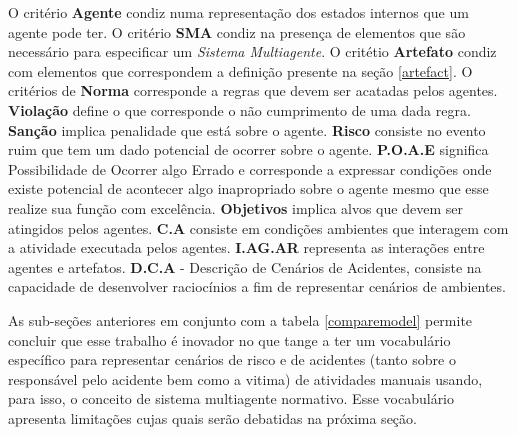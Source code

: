O critério \textbf{Agente} condiz numa representação dos estados internos que um agente pode ter. O critério \textbf{SMA} condiz na presença de elementos que são necessário para
especificar um \textit{Sistema Multiagente}. O critétio \textbf{Artefato} condiz com elementos que correspondem a definição presente na seção \ref{artefact}. O critérios de 
\textbf{Norma} corresponde a regras que devem ser acatadas pelos agentes. \textbf{Violação} define o que corresponde o não cumprimento de uma dada regra. \textbf{Sanção} implica 
penalidade que está sobre o agente. \textbf{Risco} consiste no evento ruim que tem um dado potencial de ocorrer sobre o agente. \textbf{P.O.A.E} significa Possibilidade de Ocorrer 
algo Errado e corresponde a expressar condições onde existe potencial de acontecer algo inapropriado sobre o agente mesmo que esse realize sua função com excelência.  \textbf{Objetivos} 
implica alvos que devem ser atingidos pelos agentes. \textbf{C.A} consiste em condições ambientes que interagem com a atividade executada pelos agentes. \textbf{I.AG.AR} representa 
as interações entre agentes e artefatos. \textbf{D.C.A} - Descrição de Cenários de Acidentes, consiste na capacidade de desenvolver raciocínios a fim de representar cenários de ambientes.

As sub-seções anteriores em conjunto com a tabela \ref{comparemodel} permite concluir que esse trabalho é inovador no que tange a ter um vocabulário específico para representar cenários 
de risco e de acidentes (tanto sobre o responsável pelo acidente bem como a vitima) de atividades manuais usando, para isso, o conceito de sistema multiagente normativo. Esse 
vocabulário apresenta limitações cujas quais serão debatidas na próxima seção. 